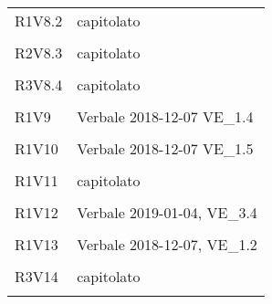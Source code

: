 \documentclass[a4paper]{article}
\begin{document}
\begin{longtable}{ >{\centering}p{}
		>{\centering}p{}}
	R1V8.2 & capitolato\\\tabularnewline
	
	R2V8.3 & capitolato\\\tabularnewline
	
	R3V8.4 & capitolato\\\tabularnewline
	
	R1V9 & Verbale 2018-12-07  VE_1.4\\\tabularnewline
	
	R1V10 & Verbale 2018-12-07  VE_1.5\\\tabularnewline
	
	R1V11 & capitolato\\\tabularnewline
	
	R1V12 & Verbale 2019-01-04, VE_3.4\\\tabularnewline
	
	R1V13 & Verbale 2018-12-07, VE_1.2\\\tabularnewline
	
	R3V14 & capitolato\\\tabularnewline
	
	
\end{longtable}
\end{document}
